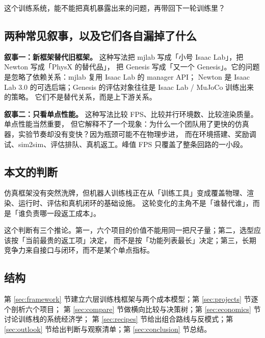 \documentclass[UTF8, 11pt, a4paper, fontset=windows]{ctexart}
\begin{document}
\begin{judgement}
这个训练系统，能不能把真机暴露出来的问题，再带回下一轮训练里？
\end{judgement}

\subsection{两种常见叙事，以及它们各自漏掉了什么}

\textbf{叙事一：新框架替代旧框架。} 这种写法把 mjlab 写成「小号 Isaac Lab」，把 Newton 写成「PhysX 的替代品」，
把 Genesis 写成「又一个 Genesis」。它的问题是忽略了依赖关系：mjlab 复用 Isaac Lab 的 manager API；
Newton 是 Isaac Lab 3.0 的可选后端；Genesis 的评估对象往往是 Isaac Lab / MuJoCo 训练出来的策略。
它们不是替代关系，而是上下游关系。

\textbf{叙事二：只看单点性能。} 这种写法比较 FPS、比较并行环境数、比较渲染质量。单点性能当然重要，
但它解释不了一个现象：为什么一个团队用了更快的仿真器，实验节奏却没有变快？因为瓶颈可能不在物理步进，
而在环境搭建、奖励调试、sim2sim、评估排队、真机返工。峰值 FPS 只覆盖了整条回路的一小段。

\subsection{本文的判断}

\begin{judgement}
仿真框架没有突然洗牌，但机器人训练栈正在从「训练工具」变成覆盖物理、渲染、运行时、评估和真机闭环的基础设施。
这轮变化的主角不是「谁替代谁」，而是「谁负责哪一段返工成本」。
\end{judgement}

这个判断有三个推论。第一，六个项目的价值不能用同一把尺子量；第二，选型应该按「当前最贵的返工项」决定，
而不是按「功能列表最长」决定；第三，长期竞争力来自接口与闭环，而不是某个单点指标。

\subsection{结构}

第 \ref{sec:framework} 节建立六层训练栈框架与两个成本模型；第 \ref{sec:projects} 节逐个剖析六个项目；
第 \ref{sec:compare} 节做横向比较与决策树；第 \ref{sec:economics} 节讨论训练栈的系统经济学；
第 \ref{sec:recipes} 节给出组合路线与反模式；第 \ref{sec:outlook} 节给出判断与观察清单；第 \ref{sec:conclusion} 节总结。

\end{document}
